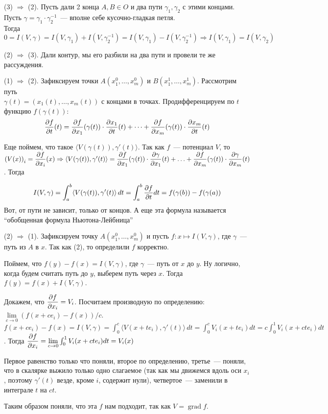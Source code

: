 \begin{Proof}
	(3) $\Rightarrow$ (2). Пусть дали 2 конца $A,B\in O$ и два пути $\gamma_1,\gamma_2$ с этими концами. Пусть $\gamma=\gamma_1\cdot\gamma_2^{-1}$~--- вполне себе кусочно-гладкая петля.\\
	Тогда $0=I(V,\gamma)=I(V,\gamma_1)+I(V,\gamma_2^{-1})=I(V,\gamma_1)-I(V,\gamma_2^{-1})\Rightarrow I(V,\gamma_1)=I(V,\gamma_2)$ 
	
	(2) $\Rightarrow$ (3). Дали контур, мы его разбили на два пути и провели те же рассуждения.
	
	(1) $\Rightarrow$ (2). Зафиксируем точки $A(x_1^0,\ldots,x_m^0)$ и $B(x_1^1,\ldots,x_m^1)$. Рассмотрим путь\\
	$\gamma(t)=(x_1(t),\ldots,x_m(t))$ с концами в точках. Продифференцируем по $t$ функцию $f(\gamma(t))$:\\
	$$\dfrac{\partial f}{\partial t}(t)=\dfrac{\partial f}{\partial x_1}(\gamma(t))\cdot\dfrac{\partial x_1}{\partial t}(t)+\dots+\dfrac{\partial f}{\partial x_m}(\gamma(t))\cdot\dfrac{\partial x_m}{\partial t}(t)$$
	
	Еще поймем, что такое $\langle V(\gamma(t)),\gamma'(t)\rangle$. Так как $f$~--- потенциал $V$, то $\left(V(x)\right)_i = \dfrac{\partial f}{\partial x_i}(x)\Rightarrow \langle V(\gamma(t)),\gamma'(t)\rangle=\dfrac{\partial f}{\partial x_1}(\gamma(t))\cdot\dfrac{\partial \gamma}{\partial x_1}(t)+\ldots+\dfrac{\partial f}{\partial x_m}(\gamma(t))\cdot\dfrac{\partial \gamma}{\partial x_m}(t)$. Тогда
	
	$$I(V,\gamma)=\int_a^b\langle V(\gamma(t)),\gamma'(t)\rangle\,dt=\int_a^b\dfrac{\partial f}{\partial t}dt=f(\gamma(b))-f(\gamma(a))$$
	Вот, от пути не зависит, только от концов. А еще эта формула называется ``обобщенная формула Ньютона-Лейбница''
	
	(2) $\Rightarrow$ (1). Зафиксируем точку $A(x_1^0,\ldots,x_m^0)$ и пусть $f\colon x\mapsto I(V,\gamma)$, где $\gamma$~--- путь из $A$ в $x$. Так как (2), то определили $f$ корректно.
	
	Поймем, что $f(y)-f(x)=I(V,\gamma)$, где $\gamma$~--- путь от $x$ до $y$. Ну логично, когда будем считать путь до $y$, выберем путь через $x$. Тогда $f(y)=f(x)+I(V,\gamma)$.
	
	Докажем, что $\dfrac{\partial f}{\partial x_i}=V_i$. Посчитаем производную по определению: $\lim\limits_{c\to 0} (f(x+c e_i)-f(x))/c$. $f(x+c e_i)-f(x)=I(V,\gamma)=\int_0^c\langle V(x+t e_i),\gamma'(t)\rangle\,dt=\int_0^c V_i(x+t e_i)dt=c\int_0^1 V_i(x+c t e_i)dt$. Тогда $\dfrac{\partial f}{\partial x_i}=\lim\limits_{c\to 0} \int_0^1 V_i(x+c t e_i)dt=V_i(x)$
	
	Первое равенство только что поняли, второе по определению, третье~--- поняли, что в скалярке выжило только одно слагаемое (так как мы движемся вдоль оси $x_i$, поэтому $\gamma'(t)$ везде, кроме $i$, содержит нули), четвертое~--- заменили в интеграле $t$ на $c t$.
	
	Таким образом поняли, что эта $f$ нам подходит, так как $V=\operatorname{grad} f$.
\end{Proof}

